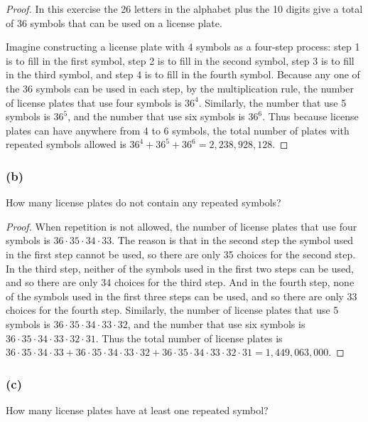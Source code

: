 \documentclass[14pt]{extarticle}
\newcommand{\cy}{\color{cyan}}
\begin{document}
\begin{proof}
In this exercise the 26 letters in the alphabet plus the 10 digits give a total of 36 symbols that can be used on a 
license plate.

Imagine constructing a license plate with 4 symbols as a four-step process: {\cy step 1} is to fill in the first symbol, {\cy step 2} is to fill in the second symbol, {\cy step 3} is to fill in the third symbol, and {\cy step 4} is to fill in the fourth symbol. Because any one of the 36 symbols can be used in each step, by the multiplication rule, the number of license plates that use four symbols is \(36^4\). Similarly, the number that use 5 symbols is \(36^5\), and the number that use six symbols is \(36^6\). Thus because license plates can have anywhere from 4 to 6 symbols, the total number of plates with repeated symbols allowed is \(36^4 + 36^5 + 36^6 = 2,238,928,128\).
\end{proof}

\subsubsection{(b)}
How many license plates do not contain any repeated symbols?

\begin{proof}
When repetition is not allowed, the number of license plates that use four symbols is \(36 \cdot 35 \cdot 34 
\cdot 33\). The reason is that in the second step the symbol used in the first step cannot be used, so there are 
only 35 choices for the second step. In the third step, neither of the symbols used in the first two steps can be 
used, and so there are only 34 choices for the third step. And in the fourth step, none of the symbols used in the 
first three steps can be used, and so there are only 33 choices for the fourth step. Similarly, the number of 
license plates that use 5 symbols is \(36 \cdot 35 \cdot 34 \cdot 33 \cdot 32\), and the number that use six symbols is 
\(36 \cdot 35 \cdot 34 \cdot 33 \cdot 32 \cdot 31\). Thus the total number of license plates is \(36 \cdot 35 \cdot 
34 \cdot 33 + 36 \cdot 35 \cdot 34 \cdot 33 \cdot 32 + 36 \cdot 35 \cdot 34 \cdot 33 \cdot 32 \cdot 31 = 
1,449,063,000\).
\end{proof}

\subsubsection{(c)}
How many license plates have at least one repeated symbol?
\end{document}
